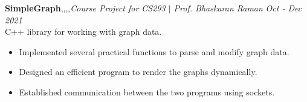 \textbf{SimpleGraph}\sep \cpp\sep\elec\sep\js\sep{\it Course Project for CS293 $|$ Prof. Bhaskaran Raman} \hfill {\sl \small Oct - Dec 2021}\\
\vspace{-5pt}
\emerrow C++ library for working with graph data.
\begin{itemize}[itemsep = -1.3 mm, leftmargin=*]
\item Implemented several practical functions to parse and modify graph data.
\item Designed an efficient program to render the graphs dynamically.
\item Established communication between the two programs using sockets.
\end{itemize}